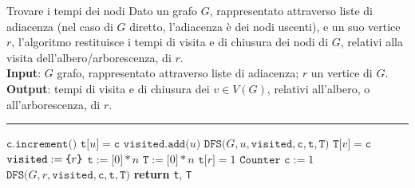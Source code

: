 \documentclass[a4paper, 12pt]{report}
\begin{document}
    \begin{framedalgo}{Trovare i tempi dei nodi}
        Dato un grafo $G$, rappresentato attraverso liste di adiacenza (nel caso di $G$ diretto, l'adiacenza è dei nodi uscenti), e un suo vertice $r$, l'algoritmo restituisce i tempi di visita e di chiusura dei nodi di $G$, relativi alla visita dell'albero/arborescenza, di $r$.\\
        \textbf{Input}: $G$ grafo, rappresentato attraverso liste di adiacenza; $r$ un vertice di $G$.\\
        \textbf{Output}: tempi di visita e di chiusura dei $v \in V(G)$, relativi all'albero, o all'arborescenza, di $r$.

        \hrule
        \begin{algorithmic}[1]
                 
                        \State $\texttt{c.increment()}$
                        \State $\texttt{t[}u\texttt{]}=\texttt{c}$
                        \State $\texttt{visited.add(}u\texttt{)}$
                        \State $\texttt{DFS(}G, u, \texttt{visited}, \texttt{c}, \texttt{t}, \texttt{T)}$
                    \EndIf
                \EndFor
                \State $\texttt{T[}v\texttt{]} = \texttt{c}$
            \EndFunction
            \\
                \State $\texttt{visited} := \verb|{|r\verb|}|$
                \State $\texttt{t} := \texttt{[}0\texttt{]} * n$
                \State $\texttt{T} := \texttt{[}0\texttt{]} * n$
                \State $\texttt{t[}r\texttt{]}=1$
                \State $\texttt{Counter c} := 1$ 
                \State $\texttt{DFS(}G, r, \texttt{visited}, \texttt{c}, \texttt{t}, \texttt{T)}$
                \State \textbf{return} \texttt{t}, \texttt{T}
            \EndFunction
        \end{algorithmic}
    \end{framedalgo}
\end{document}
